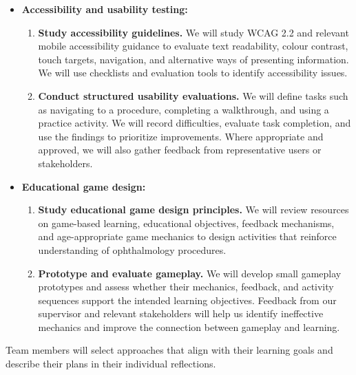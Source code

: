\documentclass[12pt]{article}
\begin{document}
\begin{enumerate}
\begin{itemize}
\begin{enumerate}
            \item \textbf{Build small technical prototypes.}
            We will implement individual features before integrating
            them into the application to practise using the framework
            and identify technical, integration, and compatibility issues.
        \end{enumerate}

        \item \textbf{Accessibility and usability testing:}
        \begin{enumerate}
            \item \textbf{Study accessibility guidelines.}
            We will study WCAG 2.2 and relevant mobile accessibility
            guidance to evaluate text readability, colour contrast,
            touch targets, navigation, and alternative ways of presenting
            information. We will use checklists and evaluation tools
            to identify accessibility issues.

            \item \textbf{Conduct structured usability evaluations.}
            We will define tasks such as navigating to a procedure,
            completing a walkthrough, and using a practice activity.
            We will record difficulties, evaluate task completion,
            and use the findings to prioritize improvements. Where
            appropriate and approved, we will also gather feedback
            from representative users or stakeholders.
        \end{enumerate}

        \item \textbf{Educational game design:}
        \begin{enumerate}
            \item \textbf{Study educational game design principles.}
            We will review resources on game-based learning, educational
            objectives, feedback mechanisms, and age-appropriate game
            mechanics to design activities that reinforce understanding
            of ophthalmology procedures.

            \item \textbf{Prototype and evaluate gameplay.}
            We will develop small gameplay prototypes and assess whether
            their mechanics, feedback, and activity sequences support
            the intended learning objectives. Feedback from our supervisor
            and relevant stakeholders will help us identify ineffective
            mechanics and improve the connection between gameplay
            and learning.
        \end{enumerate}
    \end{itemize}

    Team members will select approaches that align with their learning
    goals and describe their plans in their individual reflections.
    \end{enumerate}
\end{document}
